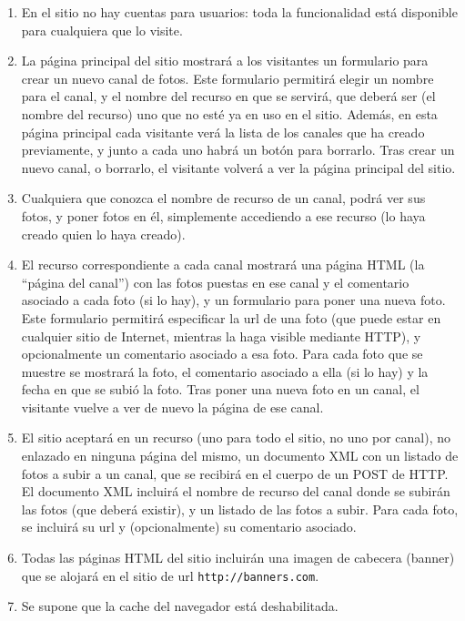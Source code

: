 \begin{enumerate}
\item En el sitio no hay cuentas para usuarios: toda la funcionalidad está disponible para cualquiera que lo visite.
\item La página principal del sitio mostrará a los visitantes un formulario para crear un nuevo canal de fotos. Este formulario permitirá elegir un nombre para el canal, y el nombre del recurso en que se servirá, que deberá ser (el nombre del recurso) uno que no esté ya en uso en el sitio. Además, en esta página principal cada visitante verá la lista de los canales que ha creado previamente, y junto a cada uno habrá un botón para borrarlo. Tras crear un nuevo canal, o borrarlo, el visitante volverá a ver la página principal del sitio.
\item Cualquiera que conozca el nombre de recurso de un canal, podrá ver sus fotos, y poner fotos en él, simplemente accediendo a ese recurso (lo haya creado quien lo haya creado).
\item El recurso correspondiente a cada canal mostrará una página HTML (la ``página del canal'') con las fotos puestas en ese canal y el comentario asociado a cada foto (si lo hay), y un formulario para poner una nueva foto. Este formulario permitirá especificar la url de una foto (que puede estar en cualquier sitio de Internet, mientras la haga visible mediante HTTP), y opcionalmente un comentario asociado a esa foto. Para cada foto que se muestre se mostrará la foto, el comentario asociado a ella (si lo hay) y la fecha en que se subió la foto.
Tras poner una nueva foto en un canal, el visitante vuelve a ver de nuevo la página de ese canal.
\item El sitio aceptará en un recurso (uno para todo el sitio, no uno por canal), no enlazado en ninguna página del mismo, un documento XML con un listado de fotos a subir a un canal, que se recibirá en el cuerpo de un POST de HTTP. El documento XML incluirá el nombre de recurso del canal donde se subirán las fotos (que deberá existir), y un listado de las fotos a subir. Para cada foto, se incluirá su url y (opcionalmente) su comentario asociado.
\item Todas las páginas HTML del sitio incluirán una imagen de cabecera (banner) que se alojará en el sitio de url \verb|http://banners.com|.

\item Se supone que la cache del navegador está deshabilitada.
\end{enumerate}

